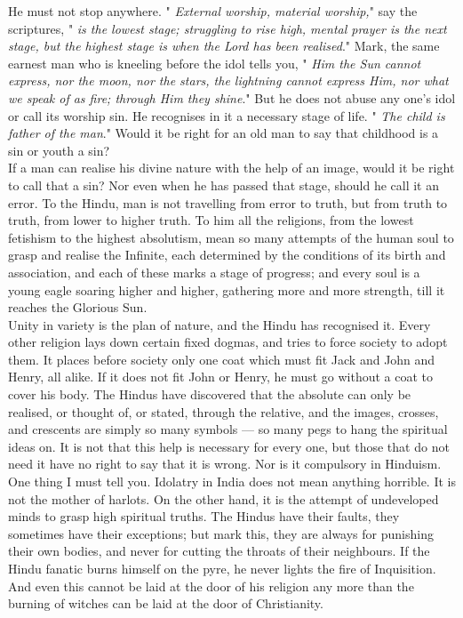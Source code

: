 He must not stop anywhere. " \textit{External worship,
material worship,}"
say the scriptures, " \textit{is the lowest stage; struggling to rise
high, mental
prayer is the next stage, but the highest stage is when the Lord has
been
realised}." Mark, the same earnest man who is kneeling before
the idol tells
you, " \textit{Him the Sun cannot express,
nor the moon, nor the stars, the
lightning cannot express Him, nor what we speak of
as fire; through Him they shine}." But he does not abuse any
one's idol or
call its worship sin. He recognises in it a necessary stage of life. " \textit{The
child is father of the man}." Would it be right for an old man
to say that
childhood is a sin or youth a sin?\\

If a man can realise his divine nature with the help of an
image, would it be right
to call that a sin? Nor even when he has passed that stage, should he
call it an error.
To the Hindu, man is not travelling from error to truth, but from truth
to truth, from
lower to higher truth. To him all the religions, from the lowest
fetishism to the
highest absolutism, mean so many attempts of the human soul to grasp
and realise the
Infinite, each determined by the conditions of its birth and
association, and each of
these marks a stage of progress; and every soul is a young eagle
soaring higher and
higher, gathering more and more strength, till it reaches the Glorious
Sun.\\

Unity in variety is the plan of nature, and the Hindu has
recognised it. Every other religion lays down certain fixed dogmas, and
tries to force society to adopt them. It places before society only one
coat which must fit Jack and John and Henry, all alike. If it does not
fit John or Henry, he must go without a coat to cover his body. The
Hindus have discovered that the absolute can only be realised, or
thought of, or stated, through the relative, and the images, crosses,
and crescents are simply so many symbols — so many pegs to hang the
spiritual ideas on. It is not that this help is necessary for every
one, but those that do not need it have no right to say that it is
wrong. Nor is it compulsory in Hinduism.\\

One thing I must tell you. Idolatry in India does not mean
anything horrible. It is not the mother of harlots. On the other hand,
it is the attempt of
undeveloped minds to grasp high
spiritual truths. The Hindus have their faults,
they sometimes have their exceptions; but mark this, they are always
for punishing
their own bodies, and never for cutting the throats of their
neighbours. If the
Hindu fanatic burns himself on the pyre, he never lights the fire of
Inquisition.
And even this cannot be laid at the door of his religion any more than
the burning
of witches can be laid at the door of Christianity.\\

